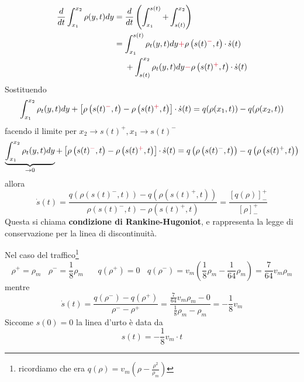 \documentclass[10pt,a4paper,twoside,openright]{book}
\begin{document}
\begin{align*}
	\frac{d}{dt}\int ^{x_{2}}_{x_{1}} \rho ( y,t) dy & =\frac{d}{dt}\left(\int ^{s( t)}_{x_{1}} +\int ^{x_{2}}_{s( t)}\right)                                                                                                  \\
	                                                 & =\int ^{s( t)}_{x_{1}} \rho _{t}( y,t) dy\textcolor[rgb]{0.82,0.01,0.11}{+} \rho \left( s( t)\textcolor[rgb]{0.82,0.01,0.11}{^{-}} ,t\right) \cdotp \dot{s}( t)         \\
	                                                 & \ \ \ \ +\int ^{x_{2}}_{s( t)} \rho _{t}( y,t) dy\textcolor[rgb]{0.82,0.01,0.11}{-} \rho \left( s( t)\textcolor[rgb]{0.82,0.01,0.11}{^{+}} ,t\right) \cdotp \dot{s}( t) 
\end{align*}
Sostituendo
\begin{equation*}
	\int ^{x_{2}}_{x_{1}} \rho _{t}( y,t) dy+\left[ \rho \left( s( t)\textcolor[rgb]{0.82,0.01,0.11}{^{-}} ,t\right) -\rho \left( s( t)\textcolor[rgb]{0.82,0.01,0.11}{^{+}} ,t\right)\right] \cdotp \dot{s}( t) =q( \rho ( x_{1} ,t)) -q( \rho ( x_{2} ,t))
\end{equation*}
facendo il limite per $x_{2}\rightarrow s( t)^{+} ,x_{1}\rightarrow s( t)^{-}$
\begin{equation*}
	\underbrace{\int ^{x_{2}}_{x_{1}} \rho _{t}( y,t) dy}_{\rightarrow 0} +\left[ \rho \left( s( t)\textcolor[rgb]{0.82,0.01,0.11}{^{-}} ,t\right) -\rho \left( s( t)\textcolor[rgb]{0.82,0.01,0.11}{^{+}} ,t\right)\right] \cdotp \dot{s}( t) =q\left( \rho \left( s( t)^{-} ,t\right)\right) -q\left( \rho \left( s( t)^{+} ,t\right)\right)
\end{equation*}
allora
\begin{equation}
	\dot{s}( t) =\frac{q\left( \rho \left( s( t)^{-} ,t\right)\right) -q\left( \rho \left( s( t)^{+} ,t\right)\right)}{\rho \left( s( t)^{-} ,t\right) -\rho \left( s( t)^{+} ,t\right)} =\frac{[ q( \rho )]^{+}_{-}}{[ \rho ]^{+}_{-}}
\end{equation}
Questa si chiama \textbf{condizione di Rankine-Hugoniot}, e rappresenta la legge di conservazione per la linea di discontinuità.

Nel caso del traffico\footnote{ricordiamo che era $q( \rho ) =v_{m}\left( \rho -\frac{\rho ^{2}}{\rho _{m}}\right)$}
\begin{equation*}
	\rho ^{+} =\rho _{m} \ \ \ \ \rho ^{-} =\frac{1}{8} \rho _{m} \ \ \ \ \ \ \ \ q\left( \rho ^{+}\right) =0\ \ \ \ q\left( \rho ^{-}\right) =v_{m}\left(\frac{1}{8} \rho _{m} -\frac{1}{64} \rho _{m}\right) =\frac{7}{64} v_{m} \rho _{m}
\end{equation*}
mentre
\begin{equation*}
	\dot{s}( t) =\frac{q\left( \rho ^{-}\right) -q\left( \rho ^{+}\right)}{\rho ^{-} -\rho ^{+}} =\frac{\frac{7}{64} v_{m} \rho _{m} -0}{\frac{1}{8} \rho _{m} -\rho _{m}} =-\frac{1}{8} v_{m}
\end{equation*}
Siccome $s( 0) =0$ la linea d'urto è data da
\begin{equation*}
	s( t) =-\frac{1}{8} v_{m} \cdotp t
\end{equation*}
\end{document}
